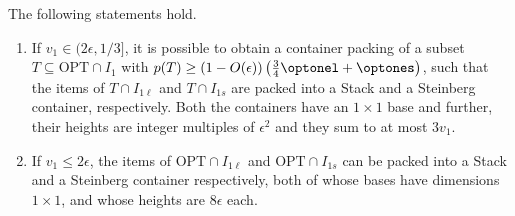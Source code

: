 \begin{lemma}
\label{lem:stackandstein}
    The following statements hold.
    \begin{enumerate}
        \item If $v_1 \in (2\epsilon, 1/3]$, it is possible to obtain a container packing of a subset $T \subseteq \text{OPT}\cap I_1$ with $p(T) \ge (1-O(\epsilon))\left(\frac{3}{4}\optonel + \optones\right)$, such that the items of $T\cap I_{1\ell}$ and $T\cap I_{1s}$ are packed into a Stack and a Steinberg container, respectively. Both the containers have an $1\times 1$ base and further, their heights are integer multiples of $\epsilon^2$ and they sum to at most $3v_1$.
        \item If $v_1 \le 2\epsilon$, the items of $\text{OPT}\cap I_{1\ell}$ and $\text{OPT}\cap I_{1s}$ can be packed into a Stack and a Steinberg container respectively, both of whose bases have dimensions $1\times 1$, and whose heights are $8\epsilon$ each.
    \end{enumerate}    
\end{lemma}
